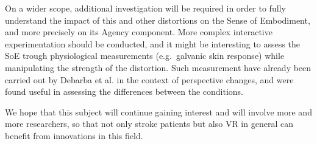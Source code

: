 On a wider scope, additional investigation will be required in order to fully understand the impact of this and other distortions on the Sense of Embodiment, and more precisely on its Agency component. More complex interactive experimentation should be conducted, and it might be interesting to assess the SoE trough physiological measurements (e.g.\ galvanic skin response) while manipulating the strength of the distortion. Such measurement have already been carried out by Debarba et al. \cite{debarba2017perspective} in the context of perspective changes, and were found useful in assessing the differences between the conditions.

We hope that this subject will continue gaining interest and will involve more and more researchers, so that not only stroke patients but also VR in general can benefit from innovations in this field.